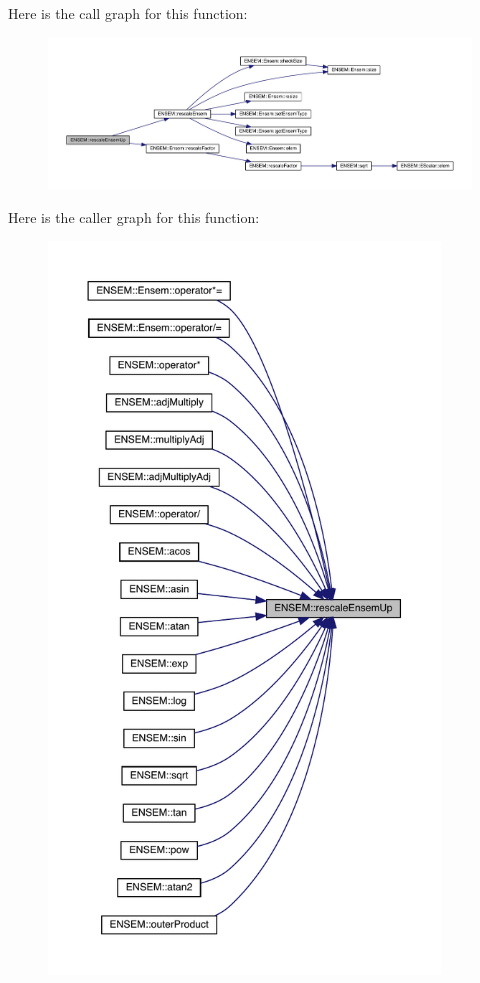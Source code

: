Here is the call graph for this function\+:\nopagebreak
\begin{figure}[H]
\begin{center}
\leavevmode
\includegraphics[width=350pt]{d1/d9e/group__eensem_ga30c22a7d0685364385ca870e38bd9b3b_cgraph}
\end{center}
\end{figure}
Here is the caller graph for this function\+:\nopagebreak
\begin{figure}[H]
\begin{center}
\leavevmode
\includegraphics[height=550pt]{d1/d9e/group__eensem_ga30c22a7d0685364385ca870e38bd9b3b_icgraph}
\end{center}
\end{figure}
\mbox{\label{group__eensem_ga01418f9a0c64b71fae7f8d400a68f25e}} 
